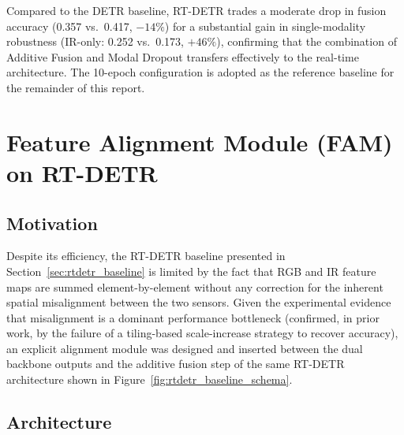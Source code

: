 \documentclass[12pt, a4paper]{article}
\begin{document}
Compared to the DETR baseline, RT-DETR trades a moderate drop in fusion accuracy (0.357 vs.\ 0.417, $-14\%$) for a substantial gain in single-modality robustness (IR-only: 0.252 vs.\ 0.173, $+46\%$), confirming that the combination of Additive Fusion and Modal Dropout transfers effectively to the real-time architecture. The 10-epoch configuration is adopted as the reference baseline for the remainder of this report.

\newpage

\section{Feature Alignment Module (FAM) on RT-DETR}
\label{sec:fam}

\subsection{Motivation}
\label{subsec:fam_motivation}

Despite its efficiency, the RT-DETR baseline presented in Section~\ref{sec:rtdetr_baseline} is limited by the fact that RGB and IR feature maps are summed element-by-element without any correction for the inherent spatial misalignment between the two sensors. Given the experimental evidence that misalignment is a dominant performance bottleneck (confirmed, in prior work, by the failure of a tiling-based scale-increase strategy to recover accuracy), an explicit alignment module was designed and inserted between the dual backbone outputs and the additive fusion step of the same RT-DETR architecture shown in Figure~\ref{fig:rtdetr_baseline_schema}.

\subsection{Architecture}
\end{document}
